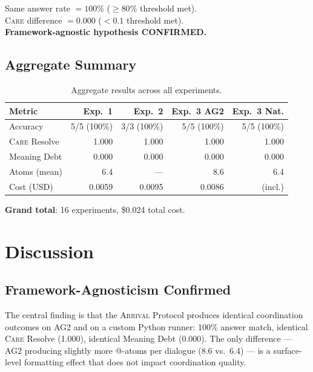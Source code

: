 \documentclass[11pt,a4paper]{article}
\newcommand{\arrival}{\textsc{Arrival}\xspace}
\newcommand{\care}{\textsc{Care}\xspace}
\begin{document}
\begin{resultbox}
Same answer rate $= 100\%$ ($\geq 80\%$ threshold met).\\
\care difference $= 0.000$ ($< 0.1$ threshold met).\\
\textbf{Framework-agnostic hypothesis CONFIRMED.}
\end{resultbox}

\subsection{Aggregate Summary}

\begin{table}[H]
\centering\small
\caption{Aggregate results across all experiments.}\label{tab:aggregate}
\begin{tabular}{@{}lrrrr@{}}
\toprule
\textbf{Metric} & \textbf{Exp.~1} & \textbf{Exp.~2} &
  \textbf{Exp.~3 AG2} & \textbf{Exp.~3 Nat.} \\
\midrule
Accuracy      & 5/5 (100\%) & 3/3 (100\%) & 5/5 (100\%) & 5/5 (100\%) \\
\care Resolve & 1.000       & 1.000       & 1.000       & 1.000 \\
Meaning Debt  & 0.000       & 0.000       & 0.000       & 0.000 \\
Atoms (mean)  & 6.4         & ---         & 8.6         & 6.4 \\
Cost (USD)    & 0.0059      & 0.0095      & 0.0086      & (incl.) \\
\bottomrule
\end{tabular}
\end{table}

\textbf{Grand total}: 16 experiments, \$0.024 total cost.

\section{Discussion}\label{sec:discussion}

\subsection{Framework-Agnosticism Confirmed}

The central finding is that the \arrival Protocol produces identical
coordination outcomes on AG2 and on a custom Python runner: 100\%
answer match, identical \care Resolve (1.000), identical Meaning Debt
(0.000).  The only difference --- AG2 producing slightly more @-atoms
per dialogue (8.6 vs.\ 6.4) --- is a surface-level formatting effect
that does not impact coordination quality.
\end{document}
